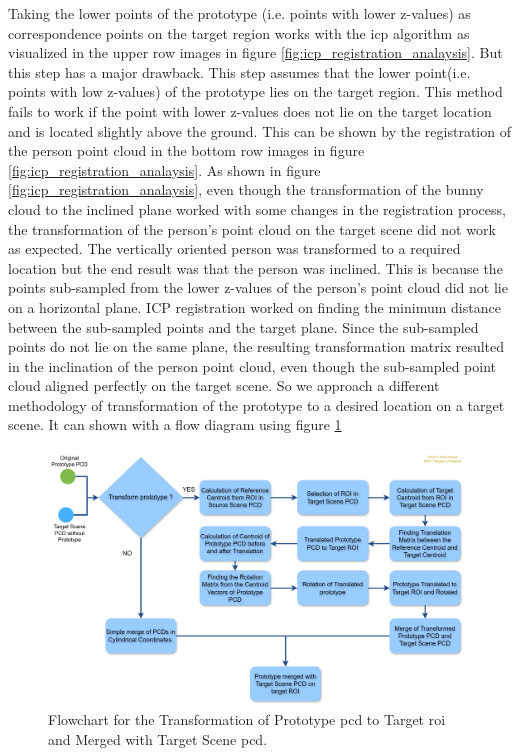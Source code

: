 Taking the lower points of the prototype (i.e. points with lower z-values) as correspondence points on the target region works with the \acrshort{icp} algorithm as visualized in the upper row images in figure \ref{fig:icp_registration_analaysis}. But this step has a major drawback. This step assumes that the lower point(i.e. points with low z-values) of the prototype lies on the target region. This method fails to work if the point with lower z-values does not lie on the target location and is located slightly above the ground. This can be shown by the registration of the person point cloud in the bottom row images in figure \ref{fig:icp_registration_analaysis}.
As shown in figure \ref{fig:icp_registration_analaysis}, even though the transformation of the bunny cloud to the inclined plane worked with some changes in the registration process, the transformation of the person's point cloud on the target scene did not work as expected. The vertically oriented person was transformed to a required location but the end result was that the person was inclined. This is because the points sub-sampled from the lower z-values of the person's point cloud did not lie on a horizontal plane. ICP registration worked on finding the minimum distance between the sub-sampled points and the target plane. Since the sub-sampled points do not lie on the same plane, the resulting transformation matrix resulted in the inclination of the person point cloud, even though the sub-sampled point cloud aligned perfectly on the target scene. So we approach a different methodology of transformation of the prototype to a desired location on a target scene. It can shown with a flow diagram using figure \ref{fig:prototype_transform_and_merge}

\begin{figure}[htbp]
    \centering
    \includegraphics[width=1\linewidth]{97_graphics/concepts/prototype_extraction.pdf}
    \caption{Flowchart for the Transformation of Prototype \acrshort{pcd} to Target \acrshort{roi} and Merged with Target Scene \acrshort{pcd}.}
    \label{fig:prototype_transform_and_merge}
\end{figure}

